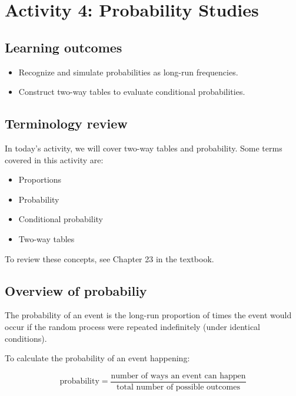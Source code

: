 \documentclass[
]{report}
\begin{document}
\newpage

\section{Activity 4: Probability Studies}\label{activity-4-probability-studies}


\subsection{Learning outcomes}\label{learning-outcomes-3}

\begin{itemize}
\item
  Recognize and simulate probabilities as long-run frequencies.
\item
  Construct two-way tables to evaluate conditional probabilities.
\end{itemize}

\subsection{Terminology review}\label{terminology-review-3}

In today's activity, we will cover two-way tables and probability. Some terms covered in this activity are:

\begin{itemize}
\item
  Proportions
\item
  Probability
\item
  Conditional probability
\item
  Two-way tables
\end{itemize}

To review these concepts, see Chapter 23 in the textbook.

\subsection{Overview of probabiliy}\label{overview-of-probabiliy}

The probability of an event is the long-run proportion of times the event would occur if the random process were repeated indefinitely (under identical conditions).

To calculate the probability of an event happening:

\[\text{probability} = \frac{\text{number of ways an event can happen}}{\text{total number of possible outcomes}}\]
\end{document}
